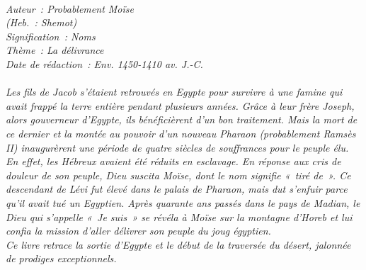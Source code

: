 \BFont
\noindent\hrulefill
{\footnotesize
\textit{
\bigskip
{\centering{}
\\Auteur~: Probablement Moïse
\\(Heb.~: Shemot)
\\Signification~: Noms
\\Thème~: La délivrance
\\Date de rédaction~: Env. 1450-1410 av. J.-C.\\}
}
\textit{
\\Les fils de Jacob s'étaient retrouvés en Egypte pour survivre à une famine qui avait frappé la terre entière pendant plusieurs années. Grâce à leur frère Joseph, alors gouverneur d'Egypte, ils bénéficièrent d'un bon traitement. Mais la mort de ce dernier et la montée au pouvoir d'un nouveau Pharaon (probablement Ramsès II) inaugurèrent une période de quatre siècles de souffrances pour le peuple élu.
\\En effet, les Hébreux avaient été réduits en esclavage. En réponse aux cris de douleur de son peuple, Dieu suscita Moïse, dont le nom signifie «~tiré de~». Ce descendant de Lévi fut élevé dans le palais de Pharaon, mais dut s'enfuir parce qu'il avait tué un Egyptien. Après quarante ans passés dans le pays de Madian, le Dieu qui s'appelle «~Je suis~» se révéla à Moïse sur la montagne d'Horeb et lui confia la mission d'aller délivrer son peuple du joug égyptien.
\\Ce livre retrace la sortie d'Egypte et le début de la traversée du désert, jalonnée de prodiges exceptionnels.\bigskip
}
}
\par\nobreak\noindent\hrulefill
